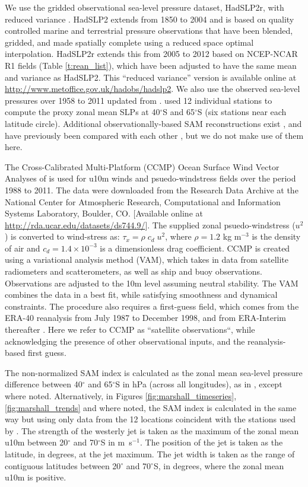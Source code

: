 \documentclass{ametsoc}
\begin{document}
We use the gridded observational sea-level pressure dataset, HadSLP2r, 
with reduced variance \citep{Allan_and_Ansell_2006}. HadSLP2 extends from 1850 to 2004 
and is based on quality controlled marine and terrestrial pressure observations that
have been blended, gridded, and made spatially complete using a reduced space optimal
interpolation. HadSLP2r extends this from 2005 to 2012 based 
on NCEP-NCAR R1 fields (Table \ref{t:rean_list}), which have been adjusted 
to have the same mean and variance as HadSLP2. This ``reduced variance''
version is available online at \url{http://www.metoffice.gov.uk/hadobs/hadslp2}. We also 
use the observed sea-level pressures over 1958 to 2011 
updated from \cite{Marshall_2003}. \cite{Marshall_2003} used 12 individual stations 
to compute the proxy zonal mean SLPs at 40$^{\circ}$S and 65$^{\circ}$S (six stations
near each latitude circle). Additional observationally-based SAM reconstructions exist
\citep[e.g.][]{Jones_et_al_2009, Visbeck_2009}, and have previously been compared with each other
\citep{Ho_et_al_2012}, but we do not make use of them here.

The Cross-Calibrated Multi-Platform (CCMP) Ocean Surface Wind Vector Analyses of 
\cite{Atlas_et_al_2011} is used for u10m winds and psuedo-windstress fields over the period
1988 to 2011. The data were downloaded from the Research Data Archive at the National 
Center for Atmospheric Research, Computational and Information Systems Laboratory, Boulder, CO. 
[Available online at \url{http://rda.ucar.edu/datasets/ds744.9/}]. 
The supplied zonal psuedo-windstress ($u^2$) is converted to wind-stress 
as: $\tau_x = \rho\; c_d\; u^2$,
where $\rho=1.2$ kg m$^{-3}$ is the density of air and $c_d=1.4\times10^{-3}$ is a dimensionless
drag coefficient. CCMP is created using a variational analysis method (VAM), which takes in data
from satellite radiometers and scatterometers, as well as ship and buoy observations. Observations
are adjusted to the 10m level assuming neutral stability. The VAM combines the data in a best fit, 
while satisfying smoothness and dynamical constraints. The procedure also requires a first-guess 
field, which comes from the ERA-40 reanalysis from July 1987 to December 1998, and from ERA-Interim 
thereafter \citep{Atlas_et_al_2011}. Here we refer to CCMP as ``satellite observations``, while
acknowledging the presence of other observational inputs, and the reanalysis-based first guess.

The non-normalized SAM index is calculated as the zonal mean sea-level pressure difference between 
40$^{\circ}$ and 65$^{\circ}$S in hPa (across all longitudes), 
as in \cite{Gillett_and_Fyfe_2013}, except where noted. Alternatively, in Figures 
\ref{fig:marshall_timeseries}, \ref{fig:marshall_trends} and where noted, the 
SAM index is calculated in the same way but using only data from the 12 locations coincident with the 
stations used by \cite{Marshall_2003}. The strength of the westerly jet is taken as the maximum of 
the zonal mean u10m between 20$^{\circ}$ and 70$^{\circ}$S in m~s$^{-1}$. The position of
the jet is taken as the latitude, in degrees, at the jet maximum. The jet width is taken as the range
of contiguous latitudes between 20$^{\circ}$ and 70$^{\circ}$S, in degrees, where the zonal mean u10m 
is positive.
\end{document}
